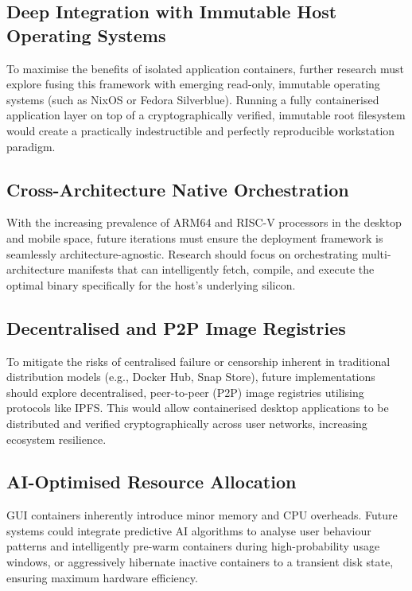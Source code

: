 \documentclass[journal,onecolumn]{IEEEtran}
\begin{document}
\subsection{Deep Integration with Immutable Host Operating Systems}
To maximise the benefits of isolated application containers, further research must explore fusing this framework with emerging read-only, immutable operating systems (such as NixOS or Fedora Silverblue). Running a fully containerised application layer on top of a cryptographically verified, immutable root filesystem would create a practically indestructible and perfectly reproducible workstation paradigm.

\subsection{Cross-Architecture Native Orchestration}
With the increasing prevalence of ARM64 and RISC-V processors in the desktop and mobile space, future iterations must ensure the deployment framework is seamlessly architecture-agnostic. Research should focus on orchestrating multi-architecture manifests that can intelligently fetch, compile, and execute the optimal binary specifically for the host's underlying silicon.

\subsection{Decentralised and P2P Image Registries}
To mitigate the risks of centralised failure or censorship inherent in traditional distribution models (e.g., Docker Hub, Snap Store), future implementations should explore decentralised, peer-to-peer (P2P) image registries utilising protocols like IPFS. This would allow containerised desktop applications to be distributed and verified cryptographically across user networks, increasing ecosystem resilience.

\subsection{AI-Optimised Resource Allocation}
GUI containers inherently introduce minor memory and CPU overheads. Future systems could integrate predictive AI algorithms to analyse user behaviour patterns and intelligently pre-warm containers during high-probability usage windows, or aggressively hibernate inactive containers to a transient disk state, ensuring maximum hardware efficiency.

\newpage
\end{document}
